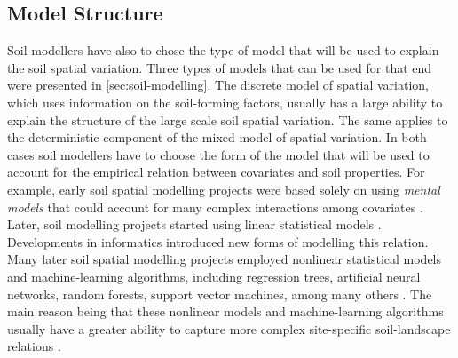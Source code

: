 \subsection{Model Structure}

\def\footlinear{\footnote{Linear models are models that involve the covariates only through a weighted sum of 
all covariates. \cite{Harrell2001a}. In such models no parameter appears as an exponent or is multiplied or 
divided by another parameter \cite{KutnerEtAl2004}.}}

Soil modellers have also to chose the type of model that will be used to explain the soil spatial variation.
Three types of models that can be used for that end were presented in \autoref{sec:soil-modelling}. The 
discrete model of spatial variation, which uses information on the soil-forming factors, usually has a large 
ability to explain the structure of the large scale soil spatial variation. The same applies to the 
deterministic component of the mixed model of spatial variation. In both cases soil modellers have to choose 
the form of the model that will be used to account for the empirical relation between covariates and soil 
properties. For example, early soil spatial modelling projects were based solely on using \emph{mental models} 
that could account for many complex interactions among covariates \cite{Hudson1992}. Later, soil modelling 
projects started using linear statistical models \cite{MooreEtAl1993, OdehEtAl1994}. Developments in 
informatics introduced new forms of modelling this relation. Many later soil spatial modelling projects 
employed nonlinear statistical models and machine-learning algorithms, including regression trees, artificial 
neural networks, random forests, support vector machines, among many others \cite{HeungEtAl2016}. The main 
reason being that these nonlinear models and machine-learning algorithms usually have a greater ability to 
capture more complex site-specific soil-landscape relations \cite{Grunwald2009}.



